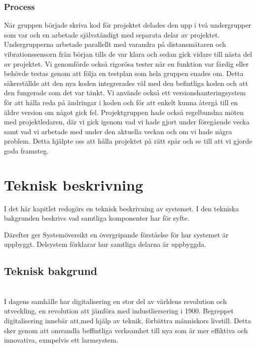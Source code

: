 \documentclass{article}
\begin{document}
\subsubsection{Process}
När gruppen började skriva kod för projektet delades den upp i två undergrupper som var och en arbetade självständigt med separata delar av projektet. 
Undergrupperna arbetade parallellt med varandra på distansmätaren och vibrationssensorn från början tills de var klara och sedan gick vidare till nästa del av projektet.
Vi genomförde också rigorösa tester när en funktion var färdig eller behövde testas genom att följa en testplan som hela gruppen enades om. 
Detta säkerställde att den nya koden integrerades väl med den befintliga koden och att den fungerade som det var tänkt.
Vi använde också ett versionshanteringsystem för att hålla reda på ändringar i koden och för att enkelt kunna återgå till en äldre version om något gick fel.
Projektgruppen hade också regelbundna möten med projektledaren,
där vi gick igenom vad vi hade gjort under föregående vecka samt vad vi arbetade med under den aktuella veckan och om vi hade några problem.
Detta hjälpte oss att hålla projektet på rätt spår och se till att vi gjorde goda framsteg.


\newpage
\section{Teknisk beskrivning}
I det här kapitlet redogörs en teknisk beskrivning av systemet. 
I den tekniska bakgrunden beskrivs vad samtliga komponenter har för syfte.

Därefter ger Systemöversikt en övergripande förståelse för hur systemet är uppbyggt. Delsystem förklarar hur samtliga delarna är uppbyggda.

\subsection{Teknisk bakgrund}\\
I dagens samhälle har digitalisering en stor del av världens revolution och utveckling, en revolution att jämföra med industliersering i 1900. Begreppet digitalisering innebär att,med hjälp av teknik, förbättra människors livstill. Detta sker genom att omvandla beffintliga verksamhet till nya som är mer effiktiva och innovativa, exmpelvis ett larmsystem. 
\end{document}
